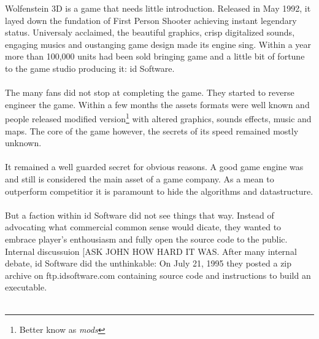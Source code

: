 Wolfenstein 3D is a game that needs little introduction. Released in May 1992, it layed down the fundation of First Person Shooter achieving instant legendary status. Universaly acclaimed, the beautiful graphics, crisp digitalized sounds, engaging musics and oustanging game design made its engine sing. Within a year more than 100,000 units had been sold bringing game and a little bit of fortune to the game studio producing it: id Software.\\
\\
The many fans did not stop at completing the game. They started to reverse engineer the game. Within a few months the assets formats were well known and people released modified version\footnote{Better know as \emph{mods}} with altered graphics, sounds effects, music and maps. The core of the game however, the secrets of its speed remained mostly unknown.\\
\\
It remained a well guarded secret for obvious reasons. A good game engine was and still is considered the main asset of a game company. As a mean to outperform competitior it is paramount to hide the algorithms and datastructure.\\
\\
But a faction within id Software did not see things that way. Instead of advocating what commercial common sense would dicate, they wanted to embrace player's enthousiasm and fully open the source code to the public. Internal discussuion [ASK JOHN HOW HARD IT WAS. After many internal debate, id Software did the unthinkable: On July 21, 1995 they posted a zip archive on ftp.idsoftware.com containing source code and instructions to build an executable.\\
\\


